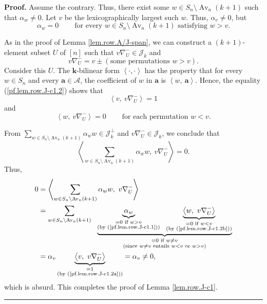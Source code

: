 \documentclass[numbers=enddot,12pt,final,onecolumn,notitlepage]{scrartcl}%
\numberwithin{exer}{subsection}
\theoremstyle{definition}
\newenvironment{proof}[1][Proof]{\noindent\textbf{#1.} }{\ \rule{0.5em}{0.5em}}
\let\sumnonlimits\sum
\renewcommand{\sum}{\sumnonlimits\limits}
\begin{document}
\begin{proof}
Assume the contrary. Thus, there exist some $w\in S_{n}\setminus
\operatorname*{Av}\nolimits_{n}\left(  k+1\right)  $ such that $\alpha_{w}%
\neq0$. Let $v$ be the lexicographically largest such $w$. Thus, $\alpha
_{v}\neq0$, but%
\begin{equation}
\alpha_{w}=0\ \ \ \ \ \ \ \ \ \ \text{for every }w\in S_{n}\setminus
\operatorname*{Av}\nolimits_{n}\left(  k+1\right)  \text{ satisfying }w>v.
\label{pf.lem.row.J-c1.1}%
\end{equation}


As in the proof of Lemma \ref{lem.row.A/J-span}, we can construct a $\left(
k+1\right)  $-element subset $U$ of $\left[  n\right]  $ such that
$v\nabla_{U}^{-}\in\mathcal{J}_{k}$ and%
\begin{equation}
v\nabla_{U}^{-}=v\pm\left(  \text{some permutations }w>v\right)  .
\label{pf.lem.row.J-c1.2}%
\end{equation}
Consider this $U$. The $\mathbf{k}$-bilinear form $\left\langle \cdot
,\cdot\right\rangle $ has the property that for every $w\in S_{n}$ and every
$\mathbf{a}\in\mathcal{A}$, the coefficient of $w$ in $\mathbf{a}$ is
$\left\langle w,\ \mathbf{a}\right\rangle $. Hence, the equality
(\ref{pf.lem.row.J-c1.2}) shows that%
\begin{equation}
\left\langle v,\ v\nabla_{U}^{-}\right\rangle =1 \label{pf.lem.row.J-c1.2a}%
\end{equation}
and%
\begin{equation}
\left\langle w,\ v\nabla_{U}^{-}\right\rangle =0\ \ \ \ \ \ \ \ \ \ \text{for
each permutation }w<v. \label{pf.lem.row.J-c1.2b}%
\end{equation}


From $\sum_{w\in S_{n}\setminus\operatorname*{Av}\nolimits_{n}\left(
k+1\right)  }\alpha_{w}w\in\mathcal{J}_{k}^{\perp}$ and $v\nabla_{U}^{-}%
\in\mathcal{J}_{k}$, we conclude that
\[
\left\langle \sum_{w\in S_{n}\setminus\operatorname*{Av}\nolimits_{n}\left(
k+1\right)  }\alpha_{w}w,\ v\nabla_{U}^{-}\right\rangle =0.
\]
Thus,%
\begin{align*}
0  &  =\left\langle \sum_{w\in S_{n}\setminus\operatorname*{Av}\nolimits_{n}%
\left(  k+1\right)  }\alpha_{w}w,\ v\nabla_{U}^{-}\right\rangle \\
&  =\sum_{w\in S_{n}\setminus\operatorname*{Av}\nolimits_{n}\left(
k+1\right)  }\ \ \underbrace{\underbrace{\alpha_{w}}_{\substack{=0\text{ if
}w>v\\\text{(by (\ref{pf.lem.row.J-c1.1}))}}}\ \ \underbrace{\left\langle
w,\ v\nabla_{U}^{-}\right\rangle }_{\substack{=0\text{ if }w<v\\\text{(by
(\ref{pf.lem.row.J-c1.2b}))}}}}_{\substack{=0\text{ if }w\neq v\\\text{(since
}w\neq v\text{ entails }w<v\text{ or }w>v\text{)}}}\\
&  =\alpha_{v}\underbrace{\left\langle v,\ v\nabla_{U}^{-}\right\rangle
}_{\substack{=1\\\text{(by (\ref{pf.lem.row.J-c1.2a}))}}}=\alpha_{v}\neq0,
\end{align*}
which is absurd. This completes the proof of Lemma \ref{lem.row.J-c1}.
\end{proof}
\end{document}
